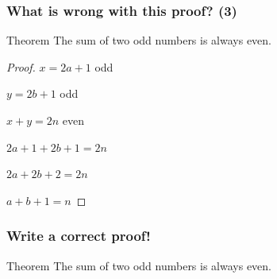 \begin{frame}
	\frametitle{What is wrong with this proof? (3)}

	\begin{block}{Theorem}
		The sum of two odd numbers is always even.
	\end{block}


	\begin{proof}
		$\displaystyle x= 2a + 1$ odd

		$\displaystyle y = 2b + 1$ odd

		$\displaystyle x+ y = 2n$ even

		$\displaystyle 2a + 1 + 2b + 1 = 2n$

		$\displaystyle 2a + 2b + 2 = 2n$

		$\displaystyle a + b + 1 = n$
	\end{proof}
\end{frame}

\begin{frame}
	\frametitle{Write a correct proof!}

	\begin{block}{Theorem}
		The sum of two odd numbers is always even.
	\end{block}
\end{frame}

